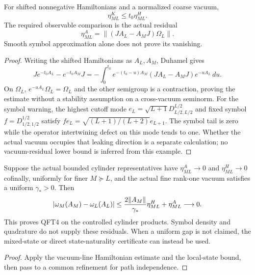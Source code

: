 \documentclass[12pt,a4paper]{article}
\begin{document}
\begin{proposition}
\label{p12:prop:tier2-qft4-estimates}
For shifted nonnegative Hamiltonians and a normalized coarse vacuum,
\begin{equation}
\label{p12:eq:tier2-transfer-estimate}
 \boxed{\eta^K_{ML}\le t_0\eta^H_{ML}.}
\end{equation}
The required observable comparison is the actual residual
\begin{equation}
\label{p12:eq:tier2-observable-estimate}
 \eta^A_{ML}=\|(JA_L-A_MJ)\Omega_L\|.
\end{equation}
Smooth symbol approximation alone does not prove its vanishing.
\end{proposition}
\begin{proof}
Writing the shifted Hamiltonians as $A_L,A_M$, Duhamel gives
\[
 Je^{-t_0 A_L}-e^{-t_0 A_M}J
 =-\int_0^{t_0}e^{-(t_0-u)A_M}(JA_L-A_MJ)e^{-uA_L}\,du.
\]
On $\Omega_L$, $e^{-uA_L}\Omega_L=\Omega_L$ and the other semigroup is
a contraction, proving the estimate without a stability assumption on a
cross-vacuum seminorm. For the symbol warning, the highest cutoff mode
$e_L=\sqrt{L+1}D^{L/2}_{L/2,L/2}$ and fixed symbol
$f=D^{1/2}_{1/2,1/2}$ satisfy
$fe_L=\sqrt{(L+1)/(L+2)}e_{L+1}$. The symbol tail is zero while the
operator intertwining defect on this mode tends to one. Whether the actual
vacuum occupies that leaking direction is a separate calculation; no
vacuum-residual lower bound is inferred from this example.
\end{proof}

\begin{theorem}
\label{p12:thm:tier2-closes-qft4-bounded}
Suppose the actual bounded cylinder representatives have
$\eta^A_{ML}\to0$ and $\eta^H_{ML}\to0$ cofinally, uniformly for finer
$M\succeq L$, and the actual fine rank-one vacuum satisfies a uniform
$\gamma_*>0$. Then
\[
 |\omega_M(A_M)-\omega_L(A_L)|
 \le {2\|A_M\|\over\gamma_*}\eta^H_{ML}+\eta^A_{ML}\longrightarrow0.
\]
This proves QFT4 on the controlled cylinder products. Symbol density and
quadrature do not supply these residuals. When a uniform gap is not claimed,
the mixed-state or direct state-naturality certificate can instead be used.
\end{theorem}
\begin{proof}
Apply the vacuum-line Hamiltonian estimate and the local-state bound, then
pass to a common refinement for path independence.
\end{proof}
\end{document}
